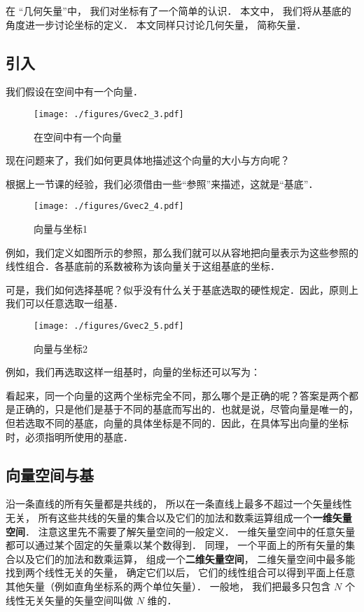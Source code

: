 

在 “几何矢量”中， 我们对坐标有了一个简单的认识． 本文中， 我们将从基底的角度进一步讨论坐标的定义． 本文同样只讨论几何矢量， 简称矢量．

\subsection{引入}
我们假设在空间中有一个向量．
\begin{figure}[ht]
\centering
\texttt{[image: ./figures/Gvec2\_3.pdf]}
\caption{在空间中有一个向量} \label{Gvec2_fig3}
\end{figure}

现在问题来了，我们如何更具体地描述这个向量的大小与方向呢？

根据上一节课的经验，我们必须借由一些“参照”来描述，这就是“基底”．
\begin{figure}[ht]
\centering
\texttt{[image: ./figures/Gvec2\_4.pdf]}
\caption{向量与坐标1} \label{Gvec2_fig4}
\end{figure}
例如，我们定义如图所示的参照，那么我们就可以从容地把向量表示为这些参照的线性组合．各基底前的系数被称为该向量关于这组基底的坐标．

可是，我们如何选择基呢？似乎没有什么关于基底选取的硬性规定．因此，原则上我们可以任意选取一组基．
\begin{figure}[ht]
\centering
\texttt{[image: ./figures/Gvec2\_5.pdf]}
\caption{向量与坐标2} \label{Gvec2_fig5}
\end{figure}
例如，我们再选取这样一组基时，向量的坐标还可以写为：

看起来，同一个向量的这两个坐标完全不同，那么哪个是正确的呢？答案是两个都是正确的，只是他们是基于不同的基底而写出的．也就是说，尽管向量是唯一的，但若选取不同的基底，向量的具体坐标是不同的．因此，在具体写出向量的坐标时，必须指明所使用的基底．

\subsection{向量空间与基}
沿一条直线的所有矢量都是共线的， 所以在一条直线上最多不超过一个矢量线性无关， 所有这些共线的矢量的集合以及它们的加法和数乘运算组成一个\textbf{一维矢量空间}． 注意这里先不需要了解矢量空间的一般定义． 一维矢量空间中的任意矢量都可以通过某个固定的矢量乘以某个数得到． 同理， 一个平面上的所有矢量的集合以及它们的加法和数乘运算， 组成一个\textbf{二维矢量空间}， 二维矢量空间中最多能找到两个线性无关的矢量， 确定它们以后， 它们的线性组合可以得到平面上任意其他矢量（例如直角坐标系的两个单位矢量）． 一般地， 我们把最多只包含 $N$ 个线性无关矢量的矢量空间叫做 $N$ 维的．

